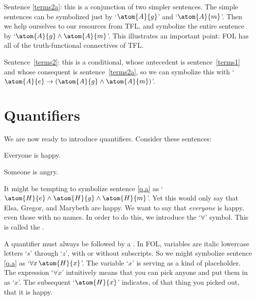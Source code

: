 Sentence \ref{terms2a}: this is a conjunction of two simpler sentences. The simple sentences can be symbolized just by `$\atom{A}{g}$' and `$\atom{A}{m}$'. Then we help ourselves to our resources from TFL, and symbolize the entire sentence by `$\atom{A}{g} \eand \atom{A}{m}$'. This illustrates an important point: FOL has all of the truth-functional connectives of TFL.

Sentence~\ref{terms2}: this is a conditional, whose antecedent is sentence~\ref{terms1} and whose consequent is sentence~\ref{terms2a}, so we can symbolize this with `$\atom{A}{e} \eif (\atom{A}{g} \eand \atom{A}{m})$'.

\section{Quantifiers}
We are now ready to introduce quantifiers. Consider these sentences:
	\begin{earg}
		\item[\ex{q.a}] Everyone is happy.
		\item[\ex{q.e}] Someone is angry.
	\end{earg}
It might be tempting to symbolize sentence \ref{q.a} as `$\atom{H}{e} \eand \atom{H}{g} \eand \atom{H}{m}$'. Yet this would only say that Elsa, Gregor, and Marybeth are happy. We want to say that \emph{everyone} is happy, even those with no names. In order to do this, we introduce the `$\forall$' symbol. This is called the .


A quantifier must always be followed by a . In FOL, variables are italic lowercase letters `$s$' through `$z$', with or without subscripts. So we might symbolize sentence \ref{q.a} as `$\forall x\, \atom{H}{x}$'.  The variable `$x$' is serving as a kind of placeholder. The expression `$\forall x$' intuitively means that you can pick anyone and put them in as `$x$'. The subsequent `$\atom{H}{x}$' indicates, of that thing you picked out, that it is happy.



